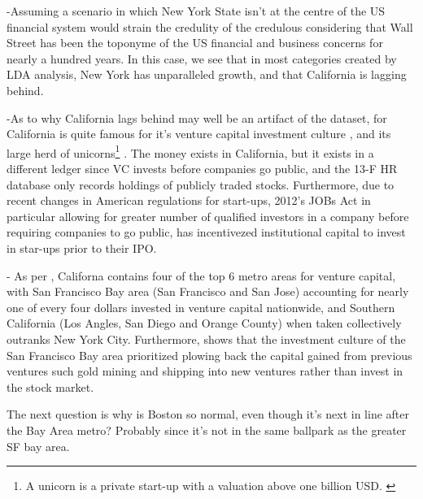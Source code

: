 -Assuming a scenario in which New York State isn't at the centre of the US financial system would strain the credulity of the credulous considering that Wall Street has been the toponyme of the US financial and business concerns for nearly a hundred years.  In this case, we see that in most categories created by LDA analysis, New York has unparalleled growth, and that California is lagging behind.  

-As to why California lags behind may well be an artifact of the dataset, for California is quite famous for it's venture capital investment culture \cite{greenventure2004}, and its large herd of unicorns\footnote{A unicorn is a private start-up with a valuation above one billion USD. \citep{Lee2013}} \cite{kenney2019unicorns}. The money exists in California, but it exists in a different ledger since VC invests before companies go public, and the 13-F HR database only records holdings of publicly traded stocks. Furthermore, due to recent changes in American regulations for start-ups, 2012's JOBs Act in particular allowing for greater number of qualified investors in a company before requiring companies to go public, has incentivezed institutional capital to invest in star-ups prior to their IPO.  

- As per \cite{florida2016rise}, Californa contains four of the top 6 metro areas for venture capital, with San Francisco Bay area (San Francisco and San Jose) accounting for nearly one of every four dollars invested in venture capital nationwide, and Southern California (Los Angles, San Diego and Orange County) when taken collectively outranks New York City. Furthermore, \cite{adams2018diversified} shows that the investment culture of the San Francisco Bay area prioritized plowing back the capital gained from previous ventures such gold mining and shipping into new ventures rather than invest in the stock market.  

The next question is why is Boston so normal, even though it's next in line after the Bay Area metro?  Probably since it's not in the same ballpark as the greater SF bay area. 

